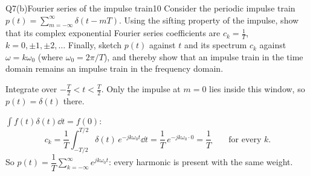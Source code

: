 \begin{qcard}{Q7(b)}{Fourier series of the impulse train}{10}
Consider the periodic impulse train $p(t)=\sum_{m=-\infty}^{\infty}\delta(t-mT)$. Using the sifting property of the impulse, show that its complex exponential Fourier series coefficients are $c_k=\frac1T$, $k=0,\pm1,\pm2,\dots$ Finally, sketch $p(t)$ against $t$ and its spectrum $c_k$ against $\omega=k\omega_0$ (where $\omega_0=2\pi/T$), and thereby show that an impulse train in the time domain remains an impulse train in the frequency domain.
\end{qcard}
\begin{solution}
 Integrate over $-\frac T2<t<\frac T2$. Only the impulse at $m=0$ lies inside this window, so $p(t)=\delta(t)$ there.

 $\int f(t)\delta(t)\dd t=f(0)$:
\[c_k=\frac1T\int_{-T/2}^{T/2}\delta(t)\,e^{-jk\omega_0t}\dd t=\frac1T\,e^{-jk\omega_0\cdot0}=\frac1T\qquad\text{for every }k.\]
So $p(t)=\dfrac1T\displaystyle\sum_{k=-\infty}^{\infty}e^{jk\omega_0t}$: every harmonic is present with the same weight.


\end{solution}
